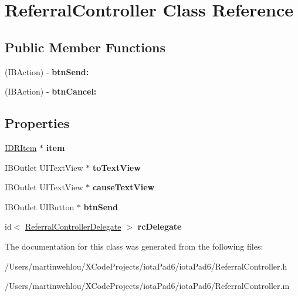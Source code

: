 \hypertarget{interface_referral_controller}{
\section{ReferralController Class Reference}
\label{interface_referral_controller}
}
\subsection*{Public Member Functions}
\begin{DoxyCompactItemize}
\item 
\hypertarget{interface_referral_controller_a1577da74b1f8f3c7b1a4f1b7cee6e4d0}{
(IBAction) -\/ {\bfseries btnSend:}}
\label{interface_referral_controller_a1577da74b1f8f3c7b1a4f1b7cee6e4d0}

\item 
\hypertarget{interface_referral_controller_ae0a16309301586b5f4fd403e28c1120d}{
(IBAction) -\/ {\bfseries btnCancel:}}
\label{interface_referral_controller_ae0a16309301586b5f4fd403e28c1120d}

\end{DoxyCompactItemize}
\subsection*{Properties}
\begin{DoxyCompactItemize}
\item 
\hypertarget{interface_referral_controller_a110042706891fc8cda74f8187de0e701}{
\hyperlink{interface_i_d_r_item}{IDRItem} $\ast$ {\bfseries item}}
\label{interface_referral_controller_a110042706891fc8cda74f8187de0e701}

\item 
\hypertarget{interface_referral_controller_a9d69f2bb131e784a0dd4ba5fbe3d1ba7}{
IBOutlet UITextView $\ast$ {\bfseries toTextView}}
\label{interface_referral_controller_a9d69f2bb131e784a0dd4ba5fbe3d1ba7}

\item 
\hypertarget{interface_referral_controller_a74500f8ebf81d106cdea90dd0eb2f758}{
IBOutlet UITextView $\ast$ {\bfseries causeTextView}}
\label{interface_referral_controller_a74500f8ebf81d106cdea90dd0eb2f758}

\item 
\hypertarget{interface_referral_controller_a963ecddaadde9e6f9cdd9761940ff447}{
IBOutlet UIButton $\ast$ {\bfseries btnSend}}
\label{interface_referral_controller_a963ecddaadde9e6f9cdd9761940ff447}

\item 
\hypertarget{interface_referral_controller_affc0b472d36ef16546b85ecf4e3c42cd}{
id$<$ \hyperlink{protocol_referral_controller_delegate-p}{ReferralControllerDelegate} $>$ {\bfseries rcDelegate}}
\label{interface_referral_controller_affc0b472d36ef16546b85ecf4e3c42cd}

\end{DoxyCompactItemize}


The documentation for this class was generated from the following files:\begin{DoxyCompactItemize}
\item 
/Users/martinwehlou/XCodeProjects/iotaPad6/iotaPad6/ReferralController.h\item 
/Users/martinwehlou/XCodeProjects/iotaPad6/iotaPad6/ReferralController.m\end{DoxyCompactItemize}
